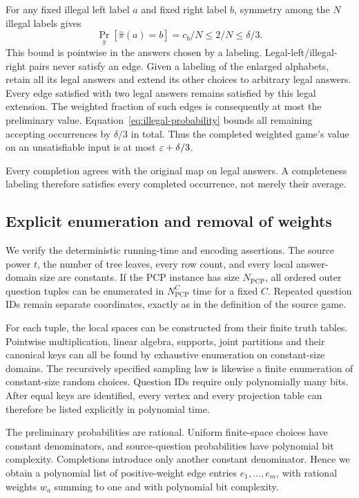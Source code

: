 For any fixed illegal left label $a$ and fixed right label $b$, symmetry
among the $N$ illegal labels gives
\begin{equation}\label{eq:illegal-probability}
   \Pr_{\widehat\pi}[\widehat\pi(a)=b]=c_b/N\le2/N\le\delta/3.
\end{equation}
This bound is pointwise in the answers chosen by a labeling.
Legal-left/illegal-right pairs never satisfy an edge.
Given a labeling of the enlarged alphabets, retain all its legal answers
and extend its other choices to arbitrary legal answers.
Every edge satisfied with two legal answers remains satisfied by this
legal extension. The weighted fraction of such edges is consequently
at most the preliminary value.
Equation~\eqref{eq:illegal-probability} bounds all remaining accepting
occurrences by $\delta/3$ in total.
Thus the completed weighted game's value on an unsatisfiable input is
at most $\varepsilon+\delta/3$.

Every completion agrees with the original map on legal answers.
A completeness labeling therefore satisfies every completed occurrence,
not merely their average.

\subsection{Explicit enumeration and removal of weights}

We verify the deterministic running-time and encoding assertions.
The source power $t$, the number of tree leaves, every row count,
and every local answer-domain size are constants.
If the PCP instance has size $N_{\mathrm{PCP}}$, all ordered outer question
tuples can be enumerated in $N_{\mathrm{PCP}}^C$ time for a fixed $C$.
Repeated question IDs remain separate coordinates, exactly as in the
definition of the source game.

For each tuple, the local spaces can be constructed from their finite truth
tables. Pointwise multiplication, linear algebra, supports, joint partitions
and their canonical keys can all be found by exhaustive enumeration on
constant-size domains. The recursively specified sampling law is likewise
a finite enumeration of constant-size random choices.
Question IDs require only polynomially many bits.
After equal keys are identified, every vertex and every projection table can
therefore be listed explicitly in polynomial time.

The preliminary probabilities are rational.
Uniform finite-space choices have constant denominators, and source-question
probabilities have polynomial bit complexity. Completions introduce only
another constant denominator.
Hence we obtain a polynomial list of positive-weight edge entries
$e_1,\ldots,e_m$, with rational weights $w_a$ summing to one and with
polynomial bit complexity.

